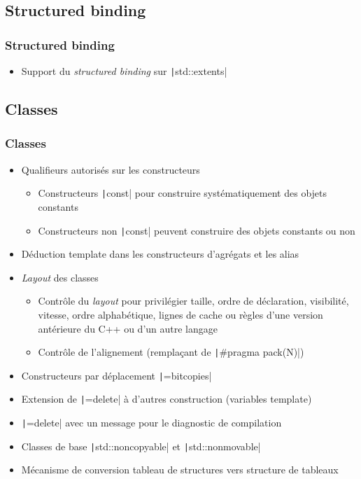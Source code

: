 \documentclass[C++.tex]{subfiles}
\begin{document}
\subsection*{Structured binding}
\begin{frame}[fragile]
	\frametitle{Structured binding}
	\begin{itemize}
		\item Support du \textit{structured binding} sur \texttt|std::extents|
	\end{itemize}

\end{frame}

\subsection*{Classes}
\begin{frame}[fragile]
	\frametitle{Classes}
	\begin{itemize}
		\item Qualifieurs autorisés sur les constructeurs
		\begin{itemize}
			\item Constructeurs \texttt|const| pour construire systématiquement des objets constants
			\item Constructeurs non \texttt|const| peuvent construire des objets constants ou non
		\end{itemize}
		\item Déduction template dans les constructeurs d'agrégats et les alias
		\item \textit{Layout} des classes
		\begin{itemize}
			\item Contrôle du \textit{layout} pour privilégier taille, ordre de déclaration, visibilité, vitesse, ordre alphabétique, lignes de cache ou règles d'une version antérieure du C++ ou d'un autre langage
			\item Contrôle de l'alignement (remplaçant de \texttt|#pragma pack(N)|)
		\end{itemize}
		\item Constructeurs par déplacement \texttt|=bitcopies|
		\item Extension de \texttt|=delete| à d'autres construction (variables template)
		\item \texttt|=delete| avec un message pour le diagnostic de compilation
		\item Classes de base \texttt|std::noncopyable| et \texttt|std::nonmovable|
		\item Mécanisme de conversion tableau de structures vers structure de tableaux

	\end{itemize}

\end{frame}
\end{document}
